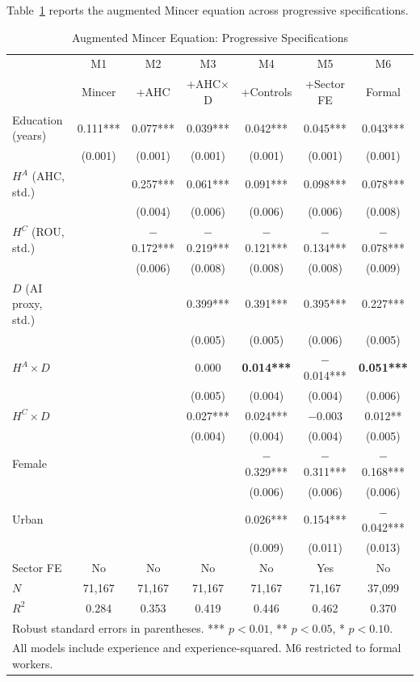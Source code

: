\documentclass[a4paper,fleqn]{cas-dc}
\begin{document}
Table~\ref{tab:main} reports the augmented Mincer equation across progressive specifications.

\begin{table}[pos=h]
\caption{Augmented Mincer Equation: Progressive Specifications}\label{tab:main}
\begin{tabular*}{\textwidth}{@{\extracolsep\fill} lcccccc @{}}
\toprule
 & M1 & M2 & M3 & M4 & M5 & M6 \\
 & Mincer & +AHC & +AHC$\times$D & +Controls & +Sector FE & Formal \\
\midrule
Education (years) & 0.111*** & 0.077*** & 0.039*** & 0.042*** & 0.045*** & 0.043*** \\
 & (0.001) & (0.001) & (0.001) & (0.001) & (0.001) & (0.001) \\[3pt]
$H^A$ (AHC, std.) & & 0.257*** & 0.061*** & 0.091*** & 0.098*** & 0.078*** \\
 & & (0.004) & (0.006) & (0.006) & (0.006) & (0.008) \\[3pt]
$H^C$ (ROU, std.) & & $-$0.172*** & $-$0.219*** & $-$0.121*** & $-$0.134*** & $-$0.078*** \\
 & & (0.006) & (0.008) & (0.008) & (0.008) & (0.009) \\[3pt]
$D$ (AI proxy, std.) & & & 0.399*** & 0.391*** & 0.395*** & 0.227*** \\
 & & & (0.005) & (0.005) & (0.006) & (0.005) \\[3pt]
$H^A \times D$ & & & 0.000 & \textbf{0.014***} & $-$0.014*** & \textbf{0.051***} \\
 & & & (0.005) & (0.004) & (0.004) & (0.006) \\[3pt]
$H^C \times D$ & & & 0.027*** & 0.024*** & $-$0.003 & 0.012** \\
 & & & (0.004) & (0.004) & (0.004) & (0.005) \\[3pt]
Female & & & & $-$0.329*** & $-$0.311*** & $-$0.168*** \\
 & & & & (0.006) & (0.006) & (0.006) \\[3pt]
Urban & & & & 0.026*** & 0.154*** & $-$0.042*** \\
 & & & & (0.009) & (0.011) & (0.013) \\
\midrule
Sector FE & No & No & No & No & Yes & No \\
$N$ & 71,167 & 71,167 & 71,167 & 71,167 & 71,167 & 37,099 \\
$R^2$ & 0.284 & 0.353 & 0.419 & 0.446 & 0.462 & 0.370 \\
\bottomrule
\multicolumn{7}{l}{\footnotesize Robust standard errors in parentheses. *** $p<0.01$, ** $p<0.05$, * $p<0.10$.}\\
\multicolumn{7}{l}{\footnotesize All models include experience and experience-squared. M6 restricted to formal workers.}
\end{tabular*}
\end{table}
\end{document}
